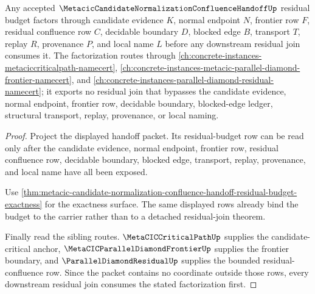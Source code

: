 \begin{theorem}
\label{thm:metacic-candidate-normalization-residual-budget-factorization}
Any accepted $\MetacicCandidateNormalizationConfluenceHandoffUp$ residual budget factors through candidate evidence $K$, normal endpoint $N$, frontier row $F$, residual confluence row $C$, decidable boundary $D$, blocked edge $B$, transport $T$, replay $R$, provenance $P$, and local name $L$ before any downstream residual join consumes it. The factorization routes through \autoref{ch:concrete-instances-metaciccriticalpath-namecert}, \autoref{ch:concrete-instances-metacic-parallel-diamond-frontier-namecert}, and \autoref{ch:concrete-instances-parallel-diamond-residual-namecert}; it exports no residual join that bypasses the candidate evidence, normal endpoint, frontier row, decidable boundary, blocked-edge ledger, structural transport, replay, provenance, or local naming.
\end{theorem}
\begin{proof}
Project the displayed handoff packet. Its residual-budget row can be read only after the candidate evidence, normal endpoint, frontier row, residual confluence row, decidable boundary, blocked edge, transport, replay, provenance, and local name have all been exposed.

Use \autoref{thm:metacic-candidate-normalization-confluence-handoff-residual-budget-exactness} for the exactness surface. The same displayed rows already bind the budget to the carrier rather than to a detached residual-join theorem.

Finally read the sibling routes. $\MetaCICCriticalPathUp$ supplies the candidate-critical anchor, $\MetaCICParallelDiamondFrontierUp$ supplies the frontier boundary, and $\ParallelDiamondResidualUp$ supplies the bounded residual-confluence row. Since the packet contains no coordinate outside those rows, every downstream residual join consumes the stated factorization first.
\end{proof}

